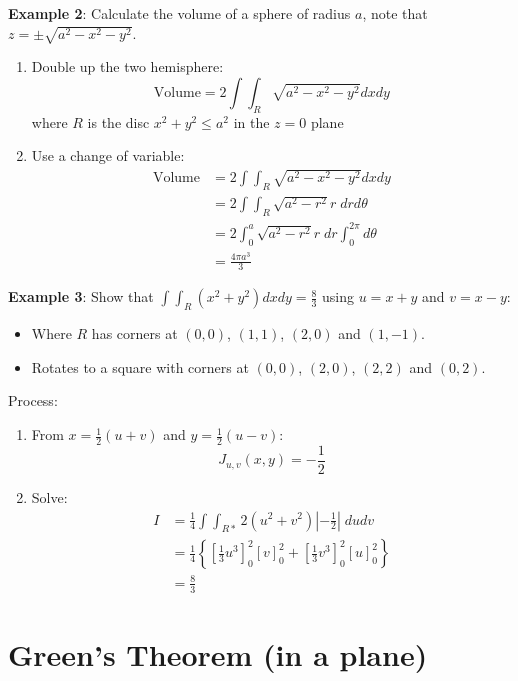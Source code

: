 \documentclass[10pt,a4paper]{article}
\begin{document}
\textbf{Example 2}: Calculate the volume of a sphere of radius $a$, note that $z=\pm \sqrt{a^2 - x^2
- y^2}$.
\begin{enumerate}
    \item Double up the two hemisphere:
    $$
        \text{Volume} = 2\int\int_R \sqrt{a^2 - x^2 - y^2} dxdy 
    $$
    where $R$ is the disc $x^2+y^2 \leq a^2$ in the $z=0$ plane

    \item Use a change of variable:
    \begin{align*}
        \text{Volume} &= 2\int \int_R \sqrt{a^2 - x^2 - y^2} dxdy \\
        &= 2 \int \int_R \sqrt{a^2 - r^2}r \; drd\theta \\
        &= 2 \int_0^a \sqrt{a^2 - r^2}r \; dr \int_0^{2\pi}d\theta \\
        &= \frac{4\pi a^3}{3}
    \end{align*}
\end{enumerate}

\textbf{Example 3}: Show that $\int \int_R (x^2 + y^2) dxdy = \frac{8}{3}$ using $u=x+y$ and
$v=x-y$:
\begin{itemize}
    \item Where $R$ has corners at $(0,0)$, $(1,1)$, $(2,0)$ and $(1,-1)$.
    \item Rotates to a square with corners at $(0,0)$, $(2,0)$, $(2,2)$ and $(0,2)$.
\end{itemize}

Process:
\begin{enumerate}
    \item From $x=\frac{1}{2}(u+v)$ and $y=\frac{1}{2}(u-v)$:
    $$
        J_{u,v}(x,y) = -\frac{1}{2}
    $$
    \item Solve:
    \begin{align*}
        I &= \frac{1}{4} \int \int_{R*} 2(u^2+v^2)|-\frac{1}{2}|\; dudv \\
        &= \frac{1}{4} \left\{[\frac{1}{3}u^3]_0^2 [v]_0^2 + [\frac{1}{3}v^3]_0^2[u]_0^2\right\} \\
        &= \frac{8}{3}
    \end{align*}
\end{enumerate}

\section{Green's Theorem (in a plane)}
\end{document}
